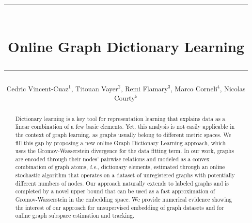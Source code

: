 \documentclass[preprint,11pt]{elsarticle}
\title{\rule{\linewidth}{0.5mm} \\ \Large{\textbf{Online Graph Dictionary Learning}}\\
\rule{\linewidth}{0.5mm}}
\author{Cedric Vincent-Cuaz$^1$, Titouan Vayer$^2$, Remi Flamary$^3$, Marco Corneli$^4$, Nicolas Courty$^5$}
\begin{document}
    
    
    


\begin{abstract}
    Dictionary learning is a key tool for representation learning that explains data as a linear combination of a few basic elements. Yet, this analysis is not easily applicable in the context of graph learning, as graphs usually belong to different metric spaces. We fill this gap by proposing a new online Graph Dictionary Learning approach, which uses the Gromov-Wasserstein divergence for the data fitting term. In our work, graphs are encoded through their nodes’ pairwise relations and modeled as a convex combination of graph atoms, {\em i.e.}, dictionary elements, estimated through an online stochastic algorithm that operates on a dataset of unregistered graphs with potentially different numbers of nodes. Our approach naturally extends to labeled graphs and is completed by a novel upper bound that can be used as a fast approximation of Gromov-Wasserstein in the embedding space. We provide numerical evidence showing the interest of our approach for unsupervised embedding of graph datasets and for online graph subspace estimation and tracking.
\end{abstract}

\maketitle
\fancyhf{} %
\fancyfoot[C]{\thepage} %
\end{document}
